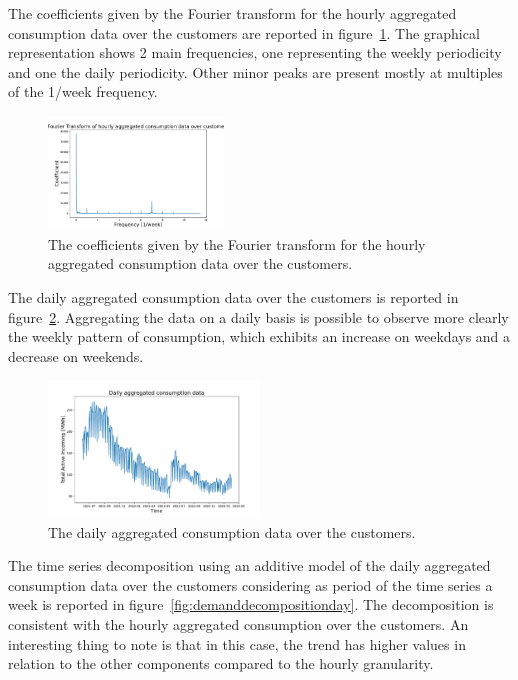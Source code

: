 The coefficients given by the Fourier transform for the hourly aggregated consumption data over the customers are reported in figure~\ref{fig:demandft}.
The graphical representation shows 2 main frequencies, one representing the weekly periodicity and one the daily periodicity.
Other minor peaks are present mostly at multiples of the 1/week frequency.

\begin{figure}[H]
\centering
\includegraphics[width=0.415\textwidth]{images/demand/ft_hour_week}
\caption{The coefficients given by the Fourier transform for the hourly aggregated consumption data over the customers.}
\label{fig:demandft}
\end{figure}

The daily aggregated consumption data over the customers is reported in figure~\ref{fig:demanddataplotday}.
Aggregating the data on a daily basis is possible to observe more clearly the weekly pattern of consumption, which exhibits an increase on weekdays and a decrease on weekends.

\begin{figure}[H]
\centering
\includegraphics[width=0.5\textwidth]{images/demand/data_day_aggregated_plot}
\caption{The daily aggregated consumption data over the customers.}
\label{fig:demanddataplotday}
\end{figure}

The time series decomposition using an additive model of the daily aggregated consumption data over the customers considering as period of the time series a week is reported in figure~\ref{fig:demanddecompositionday}.
The decomposition is consistent with the hourly aggregated consumption over the customers.
An interesting thing to note is that in this case, the trend has higher values in relation to the other components compared to the hourly granularity.

